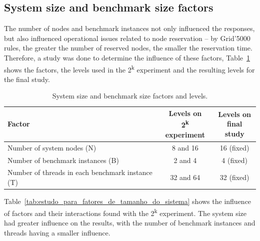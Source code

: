 \documentclass[man,floatsintext,12pt]{apa6}
\begin{document}
\subsection{System size and benchmark size factors}

The number of nodes and benchmark instances not only influenced the
responses, but also influenced operational issues related to node reservation --
by Grid'5000 rules, the greater the number of reserved nodes, the smaller the
reservation time. Therefore, a study was done to determine the influence of
these factors, Table~\ref{tab:system_size_and_benchmark_size_factors} shows
the factors, the levels used in the 2\textsuperscript{k} experiment and the resulting levels for the final study.

\begin{table}[h!]
\caption{System size and benchmark size factors and levels.}
\label{tab:system_size_and_benchmark_size_factors}
\begin{tabular}{lcc} \toprule

Factor & \thead{Levels on \\ 2\textsuperscript{k} experiment} & \thead{Levels on \\final study} \\ \midrule

Number of system nodes (N) & 8 and 16 & 16 (fixed) \\

Number of benchmark instances (B) & 2 and 4 & 4 (fixed) \\

Number of threads in each benchmark instance (T) & 32 and 64 & 32 (fixed) \\ \bottomrule

\end{tabular}
\end{table}

Table~\ref{tab:estudo_para_fatores_de_tamanho_do_sistema} shows the influence
of factors and their interactions found with the 2\textsuperscript{k}
experiment.  The system size had greater influence on the results, with the
number of benchmark instances and threads having a smaller influence.
\end{document}
